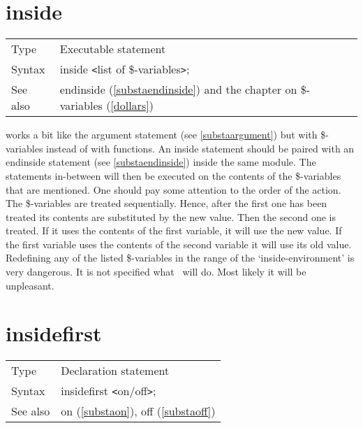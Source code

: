 
\section{inside}
\label{substainside}

\noindent \begin{tabular}{ll}
Type & Executable statement\\
Syntax & inside {\tt<}list of \$-variables{\tt>};
\\ See also & endinside (\ref{substaendinside}) and the chapter on \$-variables 
(\ref{dollars})
\end{tabular} \vspace{4mm}

\noindent works a bit like the argument 
statement (see \ref{substaargument}) but with 
\$-variables instead of with functions. An inside 
statement should be paired with an endinside statement 
(see \ref{substaendinside}) inside the same module. The statements 
in-between will then be executed on the contents of the \$-variables that 
are mentioned. One should pay some attention to the order of the action. 
The \$-variables are treated sequentially. Hence, after the first one has 
been treated its contents are substituted by the new value. Then the second 
one is treated. If it uses the contents of the first variable, it will use 
the new value. If the first variable uses the contents of the second 
variable it will use its old value. Redefining any of the listed 
\$-variables in the range of the `inside-environment' is very dangerous. It 
is not specified what \FORM\ will do. Most likely it will be 
unpleasant. 
\vspace{10mm}


\section{insidefirst}
\label{substainsidefirst}

\noindent \begin{tabular}{ll}
Type & Declaration statement\\
Syntax & insidefirst {\tt<}on/off{\tt>};
\\ See also & on (\ref{substaon}), off (\ref{substaoff})
\end{tabular} \vspace{4mm}

